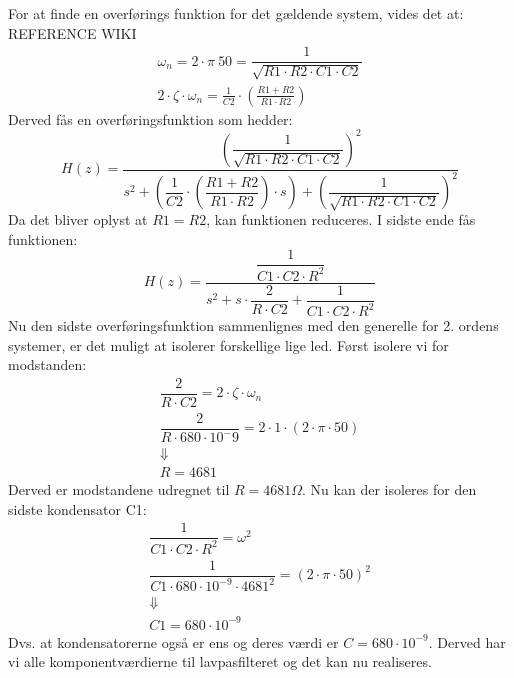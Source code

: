 For at finde en overførings funktion for det gældende system, vides det at: REFERENCE WIKI 
\begin{equation}
\begin{split}
\omega_n = 2\cdot \pi\ 50 = \dfrac{1}{\sqrt{R1\cdot R2\cdot C1\cdot C2}}\\
2\cdot \zeta\cdot\omega_n =\frac{1}{C2}\cdot \left( \frac{R1+R2}{R1\cdot R2}\right)
\end{split}
\end{equation}
Derved fås en overføringsfunktion som hedder: 
\begin{equation}
H(z)=\frac{\left(\dfrac{1}{\sqrt{R1\cdot R2 \cdot C1\cdot C2}}\right)^2}{s^2+ \left( \dfrac{1}{C2} \cdot \left( \dfrac{R1+R2}{R1\cdot R2}\right) \cdot s \right) +\left( \dfrac{1}{\sqrt{R1\cdot R2 \cdot C1\cdot C2}}\right)^2 }
\end{equation}
Da det bliver oplyst at $ R1=R2 $, kan funktionen reduceres. I sidste ende fås funktionen: 
\begin{equation}
H(z)=\dfrac{\dfrac{1}{C1 \cdot C2\cdot R^2}}{s^2+s\cdot \dfrac{2}{R\cdot C2}+ \dfrac{1}{C1\cdot C2\cdot R^2}}
\end{equation}
Nu den sidste overføringsfunktion sammenlignes med den generelle for 2. ordens systemer, er det muligt at isolerer forskellige lige led. Først isolere vi for modstanden: 
\begin{equation}
\begin{split}
\dfrac{2}{R\cdot C2}= 2\cdot \zeta \cdot \omega_n\\
\dfrac{2}{R\cdot 680\cdot 10^-9}=2\cdot 1\cdot(2\cdot\pi\cdot 50)\\
\Downarrow\\
 R= 4681
\end{split}
\end{equation}
Derved er modstandene udregnet til $ R = 4681\Omega $. Nu kan der isoleres for den sidste kondensator C1: 
\begin{equation}
\begin{split}
\dfrac{1}{C1\cdot C2\cdot R^2}= \omega^2\\
\dfrac{1}{C1\cdot 680\cdot 10^{-9}\cdot 4681^2}= (2\cdot \pi \cdot 50)^2\\
\Downarrow\\
C1=680\cdot 10^{-9}
\end{split}
\end{equation}
Dvs. at kondensatorerne også er ens og deres værdi er $ C = 680\cdot 10^{-9} $. Derved har vi alle komponentværdierne til lavpasfilteret og det kan nu realiseres. \\
